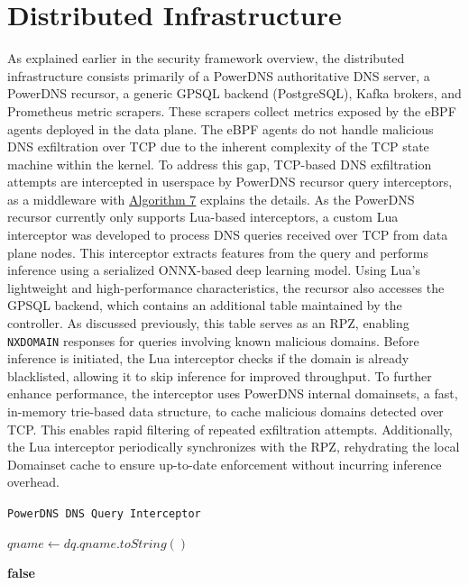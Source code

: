 \documentclass [11pt, proquest] {uwthesis}[2020/02/24]
\begin{document}
\section{Distributed Infrastructure }
As explained earlier in the security framework overview, the distributed infrastructure consists primarily of a PowerDNS authoritative DNS server, a PowerDNS recursor, a generic GPSQL backend (PostgreSQL), Kafka brokers, and Prometheus metric scrapers. These scrapers collect metrics exposed by the eBPF agents deployed in the data plane. The eBPF agents do not handle malicious DNS exfiltration over TCP due to the inherent complexity of the TCP state machine within the kernel. To address this gap, TCP-based DNS exfiltration attempts are intercepted in userspace by PowerDNS recursor query interceptors, as a middleware with \hyperref[sec:alg7]{Algorithm 7} explains the details. As the PowerDNS recursor currently only supports Lua-based interceptors, a custom Lua interceptor was developed to process DNS queries received over TCP from data plane nodes. This interceptor extracts features from the query and performs inference using a serialized ONNX-based deep learning model. Using Lua’s lightweight and high-performance characteristics, the recursor also accesses the GPSQL backend, which contains an additional table maintained by the controller. As discussed previously, this table serves as an RPZ, enabling \texttt{NXDOMAIN} responses for queries involving known malicious domains. Before inference is initiated, the Lua interceptor checks if the domain is already blacklisted, allowing it to skip inference for improved throughput. To further enhance performance, the interceptor uses PowerDNS internal domainsets, a fast, in-memory trie-based data structure, to cache malicious domains detected over TCP. This enables rapid filtering of repeated exfiltration attempts. Additionally, the Lua interceptor periodically synchronizes with the RPZ, rehydrating the local Domainset cache to ensure up-to-date enforcement without incurring inference overhead.

\begin{algorithm}[H]
\caption{\texttt{PowerDNS DNS Query Interceptor}}
\label{sec:alg7}
$qname \gets dq.qname.toString()$\;

\small %

\Return \textbf{false}\;
\end{algorithm}
\end{document}
